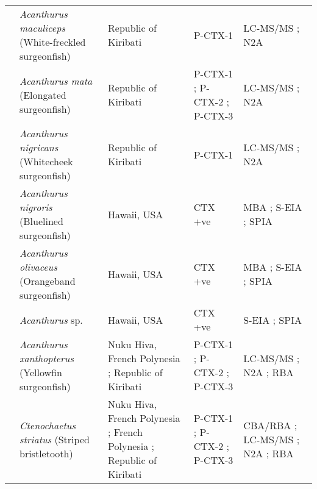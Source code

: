 \documentclass[12pt]{article}
\begin{document}
\begin{longtable}{ | p{2cm} | p{3cm} | p{4.5cm} | p{2cm} | p{3cm} | }
	& \emph{Acanthurus maculiceps} (White-freckled surgeonfish) & Republic of Kiribati \cite{mak2013pacific} & P-CTX-1 \cite{mak2013pacific} & LC-MS/MS \cite{mak2013pacific}; N2A \cite{mak2013pacific} \\
		&  \emph{Acanthurus mata} (Elongated surgeonfish) & Republic of Kiribati \cite{mak2013pacific} & P-CTX-1 \cite{mak2013pacific}; P-CTX-2 \cite{mak2013pacific}; P-CTX-3 \cite{mak2013pacific} & LC-MS/MS \cite{mak2013pacific}; N2A \cite{mak2013pacific} \\
	& \emph{Acanthurus nigricans} (Whitecheek surgeonfish) & Republic of Kiribati \cite{mak2013pacific} & P-CTX-1 \cite{mak2013pacific}& LC-MS/MS \cite{mak2013pacific}; N2A \cite{mak2013pacific} \\
	& \emph{Acanthurus nigroris} (Bluelined surgeonfish) & Hawaii, USA \cite{hokama1993evaluation} & CTX +ve \cite{hokama1993evaluation} & MBA \cite{hokama1993evaluation}; S-EIA \cite{hokama1993evaluation}; SPIA \cite{hokama1993evaluation} \\
	& \emph{Acanthurus olivaceus} (Orangeband surgeonfish) & Hawaii, USA \cite{hokama1993evaluation} & CTX +ve \cite{hokama1993evaluation} & MBA \cite{hokama1993evaluation}; S-EIA \cite{hokama1993evaluation}; SPIA \cite{hokama1993evaluation} \\
	& \emph{Acanthurus }sp. & Hawaii, USA \cite{hokama1990simplified} & CTX +ve \cite{hokama1990simplified} & S-EIA \cite{hokama1990simplified}; SPIA \cite{hokama1990simplified} \\
	& \emph{Acanthurus xanthopterus} (Yellowfin surgeonfish) & Nuku Hiva, French Polynesia \cite{darius2007ciguatera}; Republic of Kiribati \cite{mak2013pacific} &  P-CTX-1 \cite{mak2013pacific}; P-CTX-2 \cite{mak2013pacific}; P-CTX-3 \cite{mak2013pacific} & LC-MS/MS \cite{mak2013pacific}; N2A \cite{mak2013pacific}; RBA \cite{darius2007ciguatera}\\
	& \emph{Ctenochaetus striatus} (Striped bristletooth) & Nuku Hiva, French Polynesia \cite{darius2007ciguatera}; French Polynesia \cite{chinain2014mail}; Republic of Kiribati \cite{mak2013pacific} & P-CTX-1 \cite{mak2013pacific}; P-CTX-2 \cite{mak2013pacific}; P-CTX-3 \cite{mak2013pacific} & CBA/RBA \cite{chinain2014mail}; LC-MS/MS \cite{mak2013pacific}; N2A \cite{mak2013pacific}; RBA \cite{darius2007ciguatera} \\
	\hline
	\end{longtable}
	\FloatBarrier
	
\end{document}
